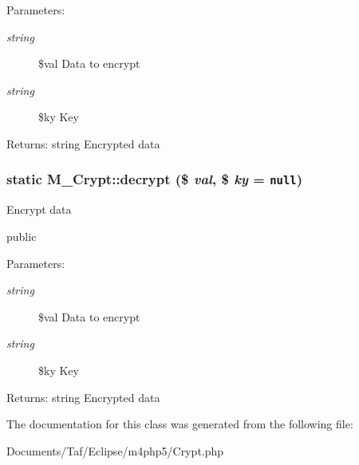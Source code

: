 \begin{Desc}
\item[Parameters:]
\begin{description}
\item[{\em string}]\$val Data to encrypt \item[{\em string}]\$ky Key \end{description}
\end{Desc}
\begin{Desc}
\item[Returns:]string Encrypted data \end{Desc}
\hypertarget{classM__Crypt_44eaf793613f9c8a5ba0626a3746f968}{
\subsubsection[decrypt]{\setlength{\rightskip}{0pt plus 5cm}static M\_\-Crypt::decrypt (\$ {\em val}, \/  \$ {\em ky} = {\tt null})}}
\label{classM__Crypt_44eaf793613f9c8a5ba0626a3746f968}


Encrypt data

public

\begin{Desc}
\item[Parameters:]
\begin{description}
\item[{\em string}]\$val Data to encrypt \item[{\em string}]\$ky Key \end{description}
\end{Desc}
\begin{Desc}
\item[Returns:]string Encrypted data \end{Desc}


The documentation for this class was generated from the following file:\begin{CompactItemize}
\item 
Documents/Taf/Eclipse/m4php5/Crypt.php\end{CompactItemize}
